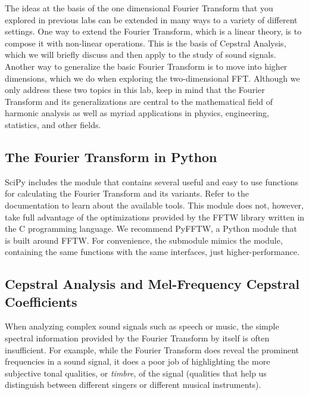 
The ideas at the basis of the one dimensional Fourier Transform that you explored in previous labs can be
extended in many ways to a variety of different settings.
One way to extend the Fourier Transform, which is a linear theory, is to compose it with non-linear operations.
This is the basis of Cepstral Analysis, which we will briefly discuss and then apply to the study of sound signals.
Another way to generalize the basic Fourier Transform is to move into higher dimensions, which we do when exploring the two-dimensional FFT.
Although we only address these two topics in this lab, keep in mind that the Fourier Transform and its generalizations are central to the mathematical field of harmonic analysis as well as myriad applications in physics, engineering, statistics, and other fields.

\subsection*{The Fourier Transform in Python}
SciPy includes the module  that contains several useful and easy to use functions
for calculating the Fourier Transform and its variants.
Refer to the documentation to learn about the available tools.
This module does not, however, take full advantage of the optimizations provided by the FFTW library written in the C programming language.
We recommend PyFFTW, a Python module that is built around FFTW.
For convenience, the submodule  mimics the
 module, containing the same functions with the same interfaces, just higher-performance.

\subsection*{Cepstral Analysis and Mel-Frequency Cepstral Coefficients}

When analyzing complex sound signals such as speech or music, the simple spectral information provided by
the Fourier Transform by itself is often insufficient.
For example, while the Fourier Transform does reveal the prominent frequencies in a sound signal, it does a poor job of highlighting the more subjective
tonal qualities, or \emph{timbre}, of the signal (qualities that help us distinguish between different singers
or different musical instruments).

